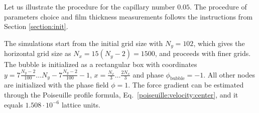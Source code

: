 \documentclass[preprint,12pt]{elsarticle}
\begin{document}
Let us illustrate the procedure for the capillary number
$0.05$. 
{\color{red} The procedure of parameters choice and film thickness measurements follows the
instructions from Section
\ref{section:init}.
}

The simulations start from the initial grid size with $N_y=102$, which gives the horizontal grid
size as $N_x=15(N_y-2)=1500$, and proceeds with finer grids.
The bubble is initialized as a rectangular box with coordinates
{\color{red}$y=7\frac{N_y-2}{100}\dots N_y-7\frac{N_y-2}{100}-1$}, $x=\frac{N_x}{3}\dots \frac{2
N_x}{3}$ and phase
$\phi_{\mathrm{bubble}}=-1$. All other nodes are initialized with the phase field
$\phi=1$. The force gradient can be estimated through the Poiseuille
profile formula, Eq.~\ref{poiseuille:velocity:center}, and it equals
$1.508 \cdot 10^{-6}$ lattice units.
\end{document}
